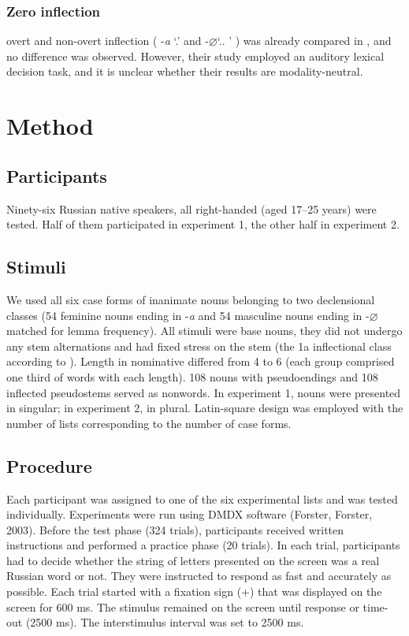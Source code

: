 \documentclass[output=paper, modfonts,newtxmath,hidelinks]{langscibook}
\begin{document}
\subsubsection{{Zero  inflection}} 
 overt and non-overt  inflection (%
-\textit{a} `\nomm.\fem'%
 and
-\textit{$\varnothing$}`\nomm.\accc. \masc'%
) was already compared in \citet{gor2017processing}, and no difference was observed. However, their study employed an auditory lexical decision task, and it is unclear whether their results are modality-neutral.

\section{Method}
\subsection{Participants} Ninety-six Russian native speakers, all right-handed (aged 17–25 years) were tested. Half of them participated in experiment 1, the other half in experiment 2.

\subsection{Stimuli} We used all six case forms of inanimate nouns belonging to two declensional classes (54 feminine nouns ending in -\textit{a} and 54 masculine nouns ending in -\textit{$\varnothing$} matched for lemma frequency). All stimuli were base nouns, they did not undergo any stem alternations and had fixed stress on the stem (the 1a inflectional class according to \citealt{zaliznyak1977grammatical}). Length in nominative differed from 4 to 6 (each group comprised one third of words with each length). 108 nouns with pseudoendings and 108 inflected pseudostems served as nonwords. In experiment 1, nouns were presented in singular; in experiment 2, in plural. Latin-square design was employed with the number of lists corresponding to the number of case forms.

\subsection{Procedure} Each participant was assigned to one of the six experimental lists and was tested individually. Experiments were run using DMDX software (Forster, Forster, 2003). Before the test phase (324 trials), participants received written instructions and performed a practice phase (20 trials). In each trial, participants had to decide whether the string of letters presented on the screen was a real Russian word or not. They were instructed to respond as fast and accurately as possible. Each trial started with a fixation sign (+) that was displayed on the screen for 600 ms. The stimulus remained on the screen until response or time-out (2500 ms). The interstimulus interval was set to 2500 ms.
\end{document}

